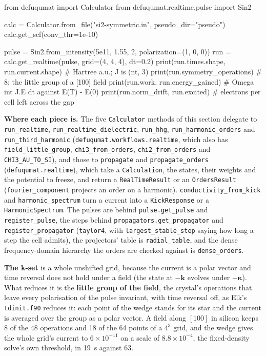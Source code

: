 \documentclass[11pt,a4paper]{article}
\newcommand{\code}[1]{\texttt{\small #1}}
\begin{document}
\begin{pycode}
from defuqumat import Calculator
from defuqumat.realtime.pulse import Sin2

calc = Calculator.from_file("si2-symmetric.in", pseudo_dir="pseudo")
calc.get_scf(conv_thr=1e-10)

pulse = Sin2.from_intensity(5e11, 1.55, 2, polarization=(1, 0, 0))
run = calc.get_realtime(pulse, grid=(4, 4, 4), dt=0.2)
print(run.times.shape, run.current.shape)   # Hartree a.u.; J is (nt, 3)
print(run.symmetry_operations)              # 8: the little group of a [100] field
print(run.work, run.energy_gained)          # Omega int J.E dt against E(T) - E(0)
print(run.norm_drift, run.excited)          # electrons per cell left across the gap
\end{pycode}

\textbf{Where each piece is.} The five \code{Calculator} methods of this section
delegate to \code{run\_realtime}, \code{run\_realtime\_dielectric},
\code{run\_hhg}, \code{run\_harmonic\_orders} and \code{run\_third\_harmonic}
(\code{defuqumat.workflows.realtime}, which also has \code{field\_little\_group},
\code{chi3\_from\_orders}, \code{chi2\_from\_orders} and \code{CHI3\_AU\_TO\_SI}),
and those to \code{propagate} and \code{propagate\_orders} (\code{defuqumat.realtime}),
which take a \code{Calculation}, the states, their weights and the potential to
freeze, and return a \code{RealTimeResult} or an \code{OrdersResult}
(\code{fourier\_component} projects an order on a harmonic). \code{conductivity\_from\_kick}
and \code{harmonic\_spectrum} turn a current into a \code{KickResponse} or a
\code{HarmonicSpectrum}. The pulses are behind \code{pulse.get\_pulse} and
\code{register\_pulse}, the steps behind \code{propagators.get\_propagator} and
\code{register\_propagator} (\code{taylor4}, with \code{largest\_stable\_step}
saying how long a step the cell admits), the projectors' table is
\code{radial\_table}, and the dense frequency-domain hierarchy the orders are
checked against is \code{dense\_orders}.

\textbf{The k-set} is a whole unshifted grid, because the current is a polar
vector and time reversal does not hold under a field (the state at
$-\mathbf k$ evolves under $-\boldsymbol\kappa$). What reduces it is the
\textbf{little group of the field}, the crystal's operations that leave every
polarisation of the pulse invariant, with time reversal off, as Elk's
\code{tdinit.f90} reduces it: each point of the wedge stands for its star and the
current is averaged over the group as a polar vector. A field along $[100]$ in
silicon keeps 8 of the 48 operations and 18 of the 64 points of a $4^3$ grid, and
the wedge gives the whole grid's current to $6\times10^{-11}$ on a scale of
$8.8\times10^{-4}$, the fixed-density solve's own threshold, in 19~s against 63.
\end{document}
